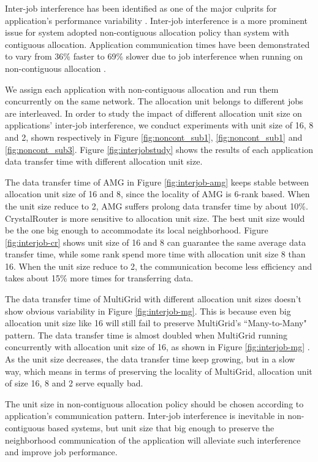 Inter-job interference has been identified as one of the major culprits for application's performance variability \cite{abhinav-sc13,skinner,rosenthal}. Inter-job interference is a more prominent issue for system adopted non-contiguous allocation policy than system with contiguous allocation. Application communication times have been demonstrated to vary from 36\% faster to 69\% slower due to job interference when running on non-contiguous allocation \cite{abhinav-sc13}.

We assign each application with non-contiguous allocation and run them concurrently on the same network. The allocation unit belongs to different jobs are interleaved. In order to study the impact of different allocation unit size on applications' inter-job interference, we conduct experiments with unit size of 16, 8 and 2, shown respectively in Figure \ref{fig:noncont_sub1}, \ref{fig:noncont_sub1} and \ref{fig:noncont_sub3}. Figure \ref{fig:interjobstudy} shows the results of each application data transfer time with different allocation unit size. 

The data transfer time of AMG in Figure \ref{fig:interjob-amg} keeps stable between allocation unit size of 16 and 8, since the locality of AMG is 6-rank based. When the unit size reduce to 2, AMG suffers prolong data transfer time by about 10\%. CrystalRouter is more sensitive to allocation unit size. The best unit size would be the one big enough to accommodate its local neighborhood. Figure \ref{fig:interjob-cr} shows unit size of 16 and 8 can guarantee the same average data transfer time, while some rank spend more time with allocation unit size 8 than 16. When the unit size reduce to 2, the communication become less efficiency and takes about 15\% more times for transferring data. 

The data transfer time of MultiGrid with different allocation unit sizes doesn't show obvious variability in Figure \ref{fig:interjob-mg}. This is because even big allocation unit size like 16 will still fail to preserve MultiGrid's ``Many-to-Many" pattern. The data transfer time is almost doubled when MultiGrid running concurrently with allocation unit size of 16, as shown in Figure \ref{fig:interjob-mg} . As the unit size decreases, the data transfer time keep growing, but in a slow way, which means in terms of preserving the locality of MultiGrid, allocation unit of size 16, 8 and 2 serve equally bad.

The unit size in non-contiguous allocation policy should be chosen according to application's communication pattern. Inter-job interference is inevitable in non-contiguous based systems, but unit size that big enough to preserve the neighborhood communication of the application will alleviate such interference and improve job performance. 



